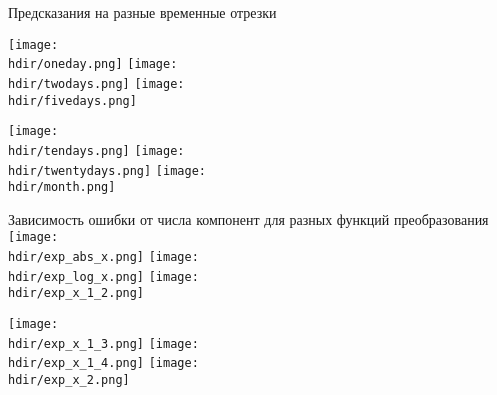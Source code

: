 \documentclass{beamer}
\newcommand{\hdir}{.}
\begin{document}
\begin{frame}{Предсказания на разные временные отрезки}
   
  \hspace*{-1.1cm}
  \vspace*{0cm}
    \centering
      \texttt{[image: \\hdir/oneday.png]}
      \hspace*{-0.2cm}
      \texttt{[image: \\hdir/twodays.png]}
      \hspace*{-0.2cm}
      \texttt{[image: \\hdir/fivedays.png]}

    \hspace*{-1.1cm}
    \vspace{1cm}
      \centering
      \texttt{[image: \\hdir/tendays.png]}
      \hspace*{-0.2cm}
      \texttt{[image: \\hdir/twentydays.png]}
      \hspace*{-0.2cm}
      \texttt{[image: \\hdir/month.png]}


\end{frame}%
\begin{frame}{Зависимость ошибки от числа компонент для разных функций преобразования}
\hspace*{-1.1cm}
  \vspace*{0cm}
    \centering
      \texttt{[image: \\hdir/exp\_abs\_x.png]}
      \hspace*{-0.2cm}
      \texttt{[image: \\hdir/exp\_log\_x.png]}
      \hspace*{-0.2cm}
      \texttt{[image: \\hdir/exp\_x\_1\_2.png]}

    \hspace*{-1.1cm}
    \vspace{1cm}
      \centering
      \texttt{[image: \\hdir/exp\_x\_1\_3.png]}
      \hspace*{-0.2cm}
      \texttt{[image: \\hdir/exp\_x\_1\_4.png]}
      \hspace*{-0.2cm}
      \texttt{[image: \\hdir/exp\_x\_2.png]}
\end{frame}
\end{document}
